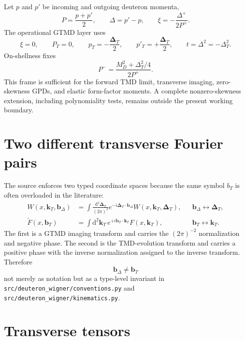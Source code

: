 \documentclass[11pt,oneside]{book}
\newcommand{\kT}{\bm{k}_{T}}
\newcommand{\DeltaT}{\bm{\Delta}_{T}}
\newcommand{\bDelta}{\bm{b}_{\Delta}}
\newcommand{\bT}{\bm{b}_{T}}
\newcommand{\dd}{\mathrm{d}}
\newcommand{\codepath}[1]{\nolinkurl{#1}}
\begin{document}
Let $p$ and $p'$ be incoming and outgoing deuteron momenta,
\begin{equation}
 P=\frac{p+p'}{2},\qquad \Delta=p'-p,
 \qquad \xi=-\frac{\Delta^+}{2P^+}.
\end{equation}
The operational GTMD layer uses
\begin{equation}
 \xi=0,\qquad P_T=0,\qquad
 p_T=-\frac{\DeltaT}{2},\qquad p'_T=+\frac{\DeltaT}{2},
 \qquad t=\Delta^2=-\Delta_T^2.
 \label{eq:symmetric-frame}
\end{equation}
On-shellness fixes
\begin{equation}
 P^- = \frac{M_D^2+\Delta_T^2/4}{2P^+}.
\end{equation}
This frame is sufficient for the forward TMD limit, transverse imaging, zero-skewness GPDs, and elastic form-factor moments.  A complete nonzero-skewness extension, including polynomiality tests, remains outside the present working boundary.

\section{Two different transverse Fourier pairs}
\label{sec:two-fourier-pairs}

The source enforces two typed coordinate spaces because the same symbol $b_T$ is often overloaded in the literature:
\begin{align}
 W(x,\kT,\bDelta)
 &=\int\frac{\dd^2\DeltaT}{(2\pi)^2}
 e^{-i\DeltaT\cdot\bDelta}W(x,\kT,\DeltaT),
 &&\bDelta\leftrightarrow\DeltaT,
 \label{eq:delta-bdelta}\\
 \widetilde F(x,\bT)
 &=\int\dd^2\kT\,e^{+i\bT\cdot\kT}F(x,\kT),
 &&\bT\leftrightarrow\kT.
 \label{eq:k-bt}
\end{align}
The first is a GTMD imaging transform and carries the $(2\pi)^{-2}$ normalization and negative phase.  The second is the TMD-evolution transform and carries a positive phase with the inverse normalization assigned to the inverse transform.  Therefore
\begin{equation}
 \boxed{\bDelta\neq\bT}
\end{equation}
not merely as notation but as a type-level invariant in \codepath{src/deuteron_wigner/conventions.py} and \codepath{src/deuteron_wigner/kinematics.py}.

\section{Transverse tensors}
\end{document}
